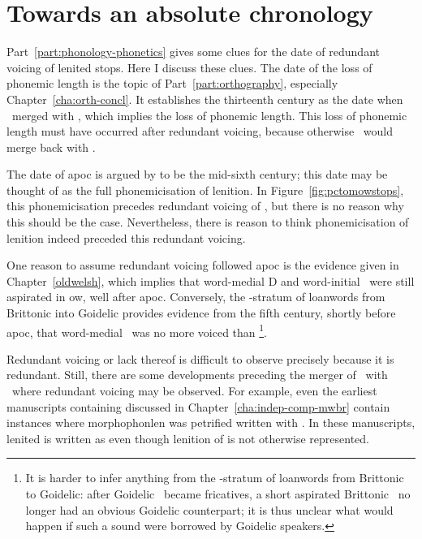 \section{Towards an absolute chronology}
\label{sec:towards-more-precise}
Part~\ref{part:phonology-phonetics} gives some clues for the date of redundant voicing of lenited stops. Here I discuss these clues. The date of the loss of phonemic length is the topic of Part~\ref{part:orthography}, especially Chapter~\ref{cha:orth-concl}. It establishes the thirteenth century as the date when \lT\ merged with \xD, which implies the loss of phonemic length. This loss of phonemic length must have occurred after redundant voicing, because otherwise \lT\ would merge back with \xT.

The date of \gls{apoc} is argued by \textcite[§~182]{jackson_language_1953} to be the mid-sixth century; this date may be thought of as the full phonemicisation of lenition. In Figure~\ref{fig:pctomowstops}, this phonemicisation precedes redundant voicing of \lT, but there is no  reason why this should be the case. Nevertheless, there is reason to think phonemicisation of lenition indeed preceded this redundant voicing. 

One reason to assume redundant voicing followed \gls{apoc} is the evidence given in Chapter~\ref{oldwelsh}, which implies that word-medial \gls{D} and word-initial \lT\ were still aspirated in \gls{ow}, well after \gls{apoc}. Conversely, the -stratum of loanwords from Brittonic into Goidelic provides evidence from the fifth century, shortly before \gls{apoc}, that word-medial \lT\ was no more voiced than \xT\footnote{It is harder to infer anything from the -stratum of loanwords from Brittonic to Goidelic: after Goidelic \lT\ became fricatives, a short aspirated Brittonic \lT\ no longer had an obvious Goidelic counterpart; it is thus unclear what would happen if such a sound were borrowed by Goidelic speakers.}. 

Redundant voicing or lack thereof is difficult to observe precisely because it is redundant. Still, there are some developments preceding the merger of \lT\ with \xD\ where redundant voicing may be observed. For example, even the earliest manuscripts containing  discussed in Chapter~\ref{cha:indep-comp-mwbr} contain instances where \gls{morphophonlen} was petrified written with . In these manuscripts, lenited  is written as  even though lenition of  is not otherwise represented.

